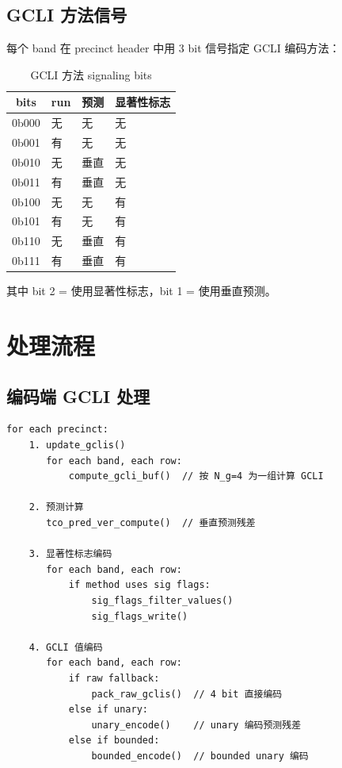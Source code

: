 \subsection{GCLI 方法信号}

每个 band 在 precinct header 中用 3 bit 信号指定 GCLI 编码方法：

\begin{table}[H]
\centering
\caption{GCLI 方法 signaling bits}
\label{tab:gcli-methods}
\begin{tabular}{@{}clll@{}}
\toprule
bits & run & 预测 & 显著性标志 \\
\midrule
0b000 & 无 & 无 & 无 \\
0b001 & 有 & 无 & 无 \\
0b010 & 无 & 垂直 & 无 \\
0b011 & 有 & 垂直 & 无 \\
0b100 & 无 & 无 & 有 \\
0b101 & 有 & 无 & 有 \\
0b110 & 无 & 垂直 & 有 \\
0b111 & 有 & 垂直 & 有 \\
\bottomrule
\end{tabular}
\end{table}

其中 bit 2 = 使用显著性标志，bit 1 = 使用垂直预测。

\section{处理流程}

\subsection{编码端 GCLI 处理}

\begin{lstlisting}[numbers=none]
for each precinct:
    1. update_gclis()
       for each band, each row:
           compute_gcli_buf()  // 按 N_g=4 为一组计算 GCLI

    2. 预测计算
       tco_pred_ver_compute()  // 垂直预测残差

    3. 显著性标志编码
       for each band, each row:
           if method uses sig flags:
               sig_flags_filter_values()
               sig_flags_write()

    4. GCLI 值编码
       for each band, each row:
           if raw fallback:
               pack_raw_gclis()  // 4 bit 直接编码
           else if unary:
               unary_encode()    // unary 编码预测残差
           else if bounded:
               bounded_encode()  // bounded unary 编码
\end{lstlisting}

